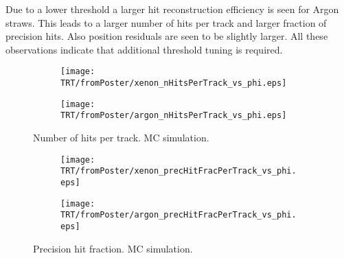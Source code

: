 Due to a lower threshold a larger hit reconstruction efficiency is seen for Argon straws. This leads to a
larger number of hits per track and larger fraction of precision hits. Also position residuals are seen to be 
slightly larger. All these observations indicate that additional threshold tuning is required.



\begin{figure}[hb]

\begin{subfigure}{.5\textwidth}
  \centering
  \texttt{[image: TRT/fromPoster/xenon\_nHitsPerTrack\_vs\_phi.eps]}
\end{subfigure}%
\begin{subfigure}{.5\textwidth}
  \centering
  \texttt{[image: TRT/fromPoster/argon\_nHitsPerTrack\_vs\_phi.eps]}
\end{subfigure}

\caption{Number of hits per track. MC simulation.}
  \label{fig:nPrecHitsPerTrack}
\end{figure}


\begin{figure}[hb]

\begin{subfigure}{.5\textwidth}
  \centering
  \texttt{[image: TRT/fromPoster/xenon\_precHitFracPerTrack\_vs\_phi.eps]}
\end{subfigure}%
\begin{subfigure}{.5\textwidth}
  \centering
  \texttt{[image: TRT/fromPoster/argon\_precHitFracPerTrack\_vs\_phi.eps]}
\end{subfigure}

\caption{Precision hit fraction. MC simulation.}
  \label{fig:precHitFracPerTrack}
\end{figure}

